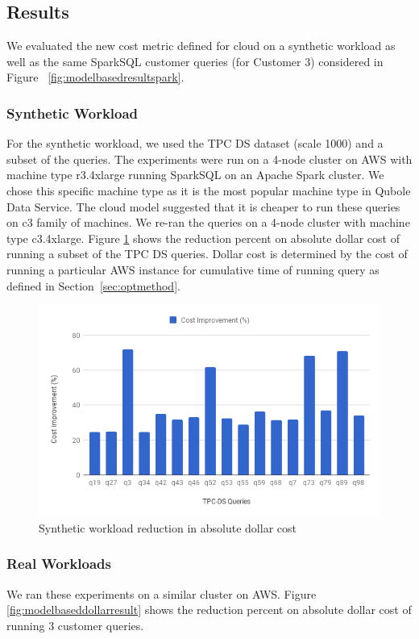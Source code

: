 \subsection{Results}

We evaluated the new cost metric defined for cloud on a synthetic workload as well as the same SparkSQL customer queries (for Customer 3) considered in Figure ~\ref{fig:modelbasedresultspark}. 

\subsubsection*{Synthetic Workload}
For the synthetic workload, we used the TPC DS dataset (scale 1000) and a subset of the queries. The experiments
were run on a 4-node cluster on AWS with machine type r3.4xlarge running SparkSQL on an Apache Spark cluster. We chose this specific machine type as it is the 
most popular machine type in Qubole Data Service. The cloud model suggested that it is cheaper to run these 
queries on c3 family of machines. We re-ran the queries on a 4-node cluster with machine type c3.4xlarge. 
Figure \ref{fig:syntheticcloudmodel} shows the reduction percent on absolute dollar cost of running a subset of the
TPC DS queries. Dollar cost is determined by the cost of running a particular AWS instance for cumulative time of running query as defined in Section~\ref{sec:optmethod}.
\begin{figure}[h]
	\includegraphics[width=\linewidth]{CloudSyn.png}
	\caption{Synthetic workload reduction in absolute dollar cost}
	\label{fig:syntheticcloudmodel}
\end{figure}

\subsubsection*{Real Workloads}
We ran these experiments on a similar cluster on AWS. Figure \ref{fig:modelbaseddollarresult} shows the reduction percent on absolute dollar cost of running 3 customer queries. 

